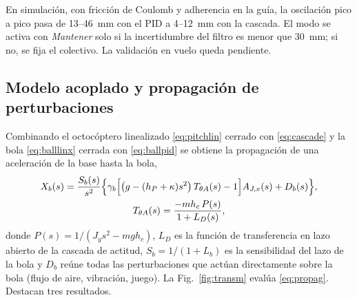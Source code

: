 En simulación, con fricción de Coulomb y adherencia en la guía, la oscilación pico a pico pasa de 13--\SI{46}{\milli\metre} con el PID a 4--\SI{12}{\milli\metre} con la cascada. El modo se activa con \emph{Mantener} solo si la incertidumbre del filtro es menor que \SI{30}{\milli\metre}; si no, se fija el colectivo. La validación en vuelo queda pendiente.

\subsection{Modelo acoplado y propagación de perturbaciones}
\label{sec:coupling}

Combinando el octocóptero linealizado \eqref{eq:pitchlin} cerrado con \eqref{eq:cascade} y la bola \eqref{eq:balllinx} cerrada con \eqref{eq:ballpid} se obtiene la propagación de una aceleración de la base hasta la bola,
\begin{gather}
  X_b(s)=\frac{S_b(s)}{s^2}\Big\{\gamma_b\Big[\big(g-(h_P+\kappa)s^2\big)\,T_{\theta A}(s)-1\Big]A_{J,x}(s)+D_b(s)\Big\}, \label{eq:propag}\\
  T_{\theta A}(s)=\frac{-m h_c\,P(s)}{1+L_D(s)}, \notag
\end{gather}
donde $P(s)=1/(J_ys^2-mgh_c)$, $L_D$ es la función de transferencia en lazo abierto de la cascada de actitud, $S_b=1/(1+L_b)$ es la sensibilidad del lazo de la bola y $D_b$ reúne todas las perturbaciones que actúan directamente sobre la bola (flujo de aire, vibración, juego). La Fig.~\ref{fig:transm} evalúa \eqref{eq:propag}. Destacan tres resultados.

